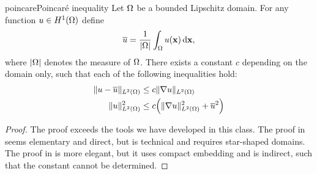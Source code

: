 \begin{Lemma*}{poincare}{Poincaré inequality}
  Let $\Omega$ be a bounded Lipschitz domain. For any function
  $u\in H^1(\Omega)$ define
  \begin{gather}
    \overline u = \frac1{\lvert\Omega\rvert} \int_\Omega u(\mathbf x) \,\mathrm{d} \mathbf x,
  \end{gather}
  where $\lvert\Omega\rvert$ denotes the measure of $\Omega$. There exists
  a constant $c$ depending on the domain only, such that each of the
  following inequalities hold:
  \begin{align}
    \lVert u-\overline u\rVert_{L^2(\Omega)} &\le c \lVert\nabla u\rVert_{L^2(\Omega)}\\
    \lVert u\rVert_{L^2(\Omega)}^2 &\le c \Bigl(\lVert\nabla u\rVert_{L^2(\Omega)}^2 + \overline u^2\Bigr)
  \end{align}
\end{Lemma*}

\begin{proof}
  The proof exceeds the tools we have developed in this class. The
  proof in \cite[Section 7.8]{GilbargTrudinger98} seems elementary and
  direct, but is technical and requires star-shaped domains. The proof
  in \cite[Section 5.8.1]{Evans98} is more elegant, but it uses
  compact embedding and is indirect, such that the constant cannot be
  determined.
\end{proof}




